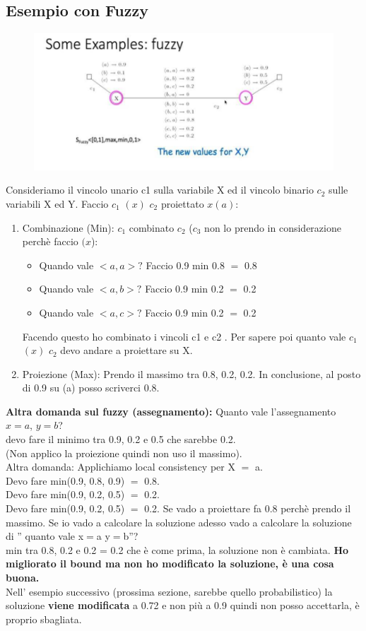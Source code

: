 \subsection{Esempio con Fuzzy}
\begin{figure}[htp]
	\centering
    \includegraphics[width=12cm, keepaspectratio]{img/Cap5/Fuzzy.png}
\end{figure}
Consideriamo il vincolo unario c1 sulla variabile X ed il vincolo binario $c_2$ sulle variabili X ed Y. Faccio $c_1$ $(x)$ $c_2$ proiettato $x(a)$:
\begin{enumerate}
    \item Combinazione (Min): $c_1$ combinato $c_2$ ($c_3$ non lo prendo in considerazione perchè faccio $(x$):
    \begin{itemize}
        \item Quando vale $< a, a >?$ Faccio 0.9 min 0.8 $=$ 0.8
        \item Quando vale $< a, b >?$ Faccio 0.9 min 0.2 $=$ 0.2
        \item Quando vale $< a, c >?$ Faccio 0.9 min 0.2 $=$ 0.2
    \end{itemize}
    Facendo questo ho combinato i vincoli c1 e c2 . Per sapere poi quanto vale $c_1$ $(x)$ $c_2$ devo andare a proiettare su X.
    \item Proiezione (Max): Prendo il massimo tra 0.8, 0.2, 0.2. In conclusione, al posto di 0.9 su (a) posso scriverci 0.8.
\end{enumerate}
\textbf{Altra domanda sul fuzzy (assegnamento): } Quanto vale l’assegnamento $x=a$, $y=b$? 
\\devo fare il minimo tra 0.9, 0.2 e 0.5 che sarebbe 0.2. 
\\(Non applico la proiezione quindi non uso il massimo).
\\Altra domanda: Applichiamo local consistency per X $=$ a.
\\Devo fare min(0.9, 0.8, 0.9) $=$ 0.8.
\\Devo fare min(0.9, 0.2, 0.5) $=$ 0.2.
\\Devo fare min(0.9, 0.2, 0.5) $=$ 0.2.
Se vado a proiettare fa 0.8 perchè prendo il massimo. Se io vado a calcolare la soluzione adesso vado a calcolare la soluzione di '' quanto vale x$=$a y$=$b''?
\\min tra 0.8, 0.2 e 0.2 = 0.2 che è come prima, la soluzione non è cambiata.
\textbf{Ho migliorato il bound ma non ho modificato la soluzione, è una cosa buona.}
\\Nell’ esempio successivo (prossima sezione, sarebbe quello probabilistico) la soluzione \textbf{viene modificata} a 0.72 e non più a 0.9 quindi non posso accettarla, è proprio sbagliata.
